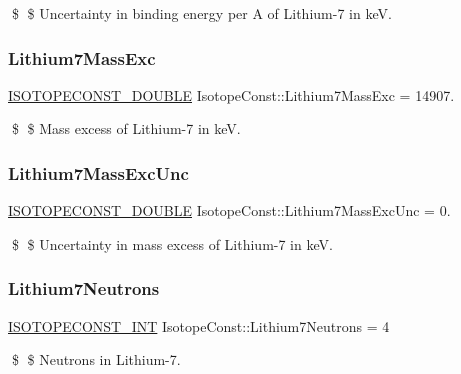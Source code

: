 \$ \$ Uncertainty in binding energy per A of Lithium-\/7 in keV. \mbox{\label{group___isotope_const-_lithium-_li7_ga85767bc8d5aaff5f153b03d00f550e73}} 
\subsubsection{\texorpdfstring{Lithium7\+Mass\+Exc}{Lithium7MassExc}}
{\footnotesize\ttfamily \mbox{\hyperlink{group___isotope_const-_macros_ga8f45a7272ce02c0b4c65c44636ed719a}{I\+S\+O\+T\+O\+P\+E\+C\+O\+N\+S\+T\+\_\+\+D\+O\+U\+B\+LE}} Isotope\+Const\+::\+Lithium7\+Mass\+Exc = 14907.}

\$ \$ Mass excess of Lithium-\/7 in keV. \mbox{\label{group___isotope_const-_lithium-_li7_ga8b9e6bbc08eccd42b2d64229ea2c32a5}} 
\subsubsection{\texorpdfstring{Lithium7\+Mass\+Exc\+Unc}{Lithium7MassExcUnc}}
{\footnotesize\ttfamily \mbox{\hyperlink{group___isotope_const-_macros_ga8f45a7272ce02c0b4c65c44636ed719a}{I\+S\+O\+T\+O\+P\+E\+C\+O\+N\+S\+T\+\_\+\+D\+O\+U\+B\+LE}} Isotope\+Const\+::\+Lithium7\+Mass\+Exc\+Unc = 0.}

\$ \$ Uncertainty in mass excess of Lithium-\/7 in keV. \mbox{\label{group___isotope_const-_lithium-_li7_gac860165049a504158d48f795525f3614}} 
\subsubsection{\texorpdfstring{Lithium7\+Neutrons}{Lithium7Neutrons}}
{\footnotesize\ttfamily \mbox{\hyperlink{group___isotope_const-_macros_ga5f18360b3e99483a35c32d789e62621c}{I\+S\+O\+T\+O\+P\+E\+C\+O\+N\+S\+T\+\_\+\+I\+NT}} Isotope\+Const\+::\+Lithium7\+Neutrons = 4}

\$ \$ Neutrons in Lithium-\/7. \mbox{\label{group___isotope_const-_lithium-_li7_gad05316718130babbb792839660df0ab0}} 
